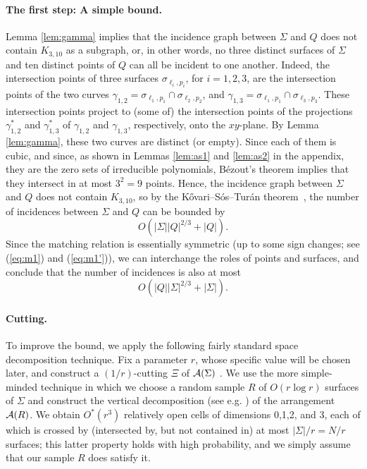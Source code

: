 \documentclass[12pt]{article}
\def\A{{\cal A}}
\begin{document}
\paragraph{The first step: A simple bound.}
Lemma \ref{lem:gamma} implies that the incidence graph between $\Sigma$
and $Q$ does not contain $K_{3,10}$ as a subgraph, or,
in other words, no three distinct surfaces of $\Sigma$ and ten distinct
points of $Q$ can all be incident to one another. Indeed, the
intersection points of three surfaces $\sigma_{\ell_i,p_i}$, for
$i=1,2,3$, are the intersection points of the two curves
$\gamma_{1,2} = \sigma_{\ell_1,p_1} \cap \sigma_{\ell_2,p_2}$, and
$\gamma_{1,3} = \sigma_{\ell_1,p_1} \cap \sigma_{\ell_3,p_3}$. These
intersection points project to (some of) the intersection points of the
projections $\gamma^*_{1,2}$ and $\gamma^*_{1,3}$ of $\gamma_{1,2}$
and $\gamma_{1,3}$, respectively, onto the $xy$-plane.
By Lemma \ref{lem:gamma}, these two curves are distinct (or empty).
Since each of them is cubic, and since, as shown in Lemmas \ref{lem:as1}
and \ref{lem:as2} in the appendix, they are the zero sets of irreducible
polynomials,
B\'ezout's theorem \cite{Sha} implies that
they intersect in at most $3^2=9$ points.
Hence, the incidence graph between $\Sigma$ and $Q$ does not
contain $K_{3,10}$, so
by the K\H{o}vari--S\'os--Tur\'an theorem~\cite{KST54}, the
number of incidences between $\Sigma$ and $Q$ can be bounded by
\begin{equation*}
O(|\Sigma||Q|^{2/3} + |Q|).
\end{equation*}
Since the matching relation is essentially symmetric (up to some
sign changes; see (\ref{eq:m1}) and (\ref{eq:m1'})), we can interchange
the roles of points and surfaces, and conclude that the number of
incidences is also at most
\begin{equation} \label{bound:weak}
O(|Q||\Sigma|^{2/3} + |\Sigma|).
\end{equation}

\paragraph{Cutting.}
To improve the bound, we apply the following fairly standard space 
decomposition technique.
Fix a parameter $r$, whose specific value will be chosen later,
and construct a $(1/r)$-cutting $\Xi$ of $\A(\Sigma)$ \cite{Ch05}. 
We use the more simple-minded technique in which we choose a random
sample $R$ of $O(r\log r)$ surfaces of $\Sigma$ and construct the
vertical decomposition (see e.g. \cite{SA}) of the arrangement
$\A(R)$. We obtain
$O^*(r^3)$ relatively open cells of dimensions 0,1,2, and 3, each
of which is crossed by (intersected by, but not contained in) at most
$|\Sigma|/r=N/r$ surfaces; this latter property holds with high
probability, and we simply assume that our sample $R$ does satisfy it.
\end{document}
